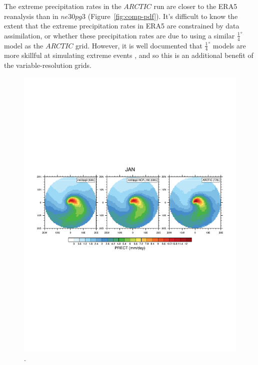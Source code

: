 \documentclass[draft]{agujournal2019}
\begin{document}
The extreme precipitation rates in the $ARCTIC$ run are closer to the ERA5 reanalysis than in $ne30pg3$ (Figure~\ref{fig:comp-pdf}). It's difficult to know the extent that the extreme precipitation rates in ERA5 are constrained by data assimilation, or whether these precipitation rates are due to using a similar $\frac{1}{4}^{\circ}$ model as the $ARCTIC$ grid. However, it is well documented that $\frac{1}{4}^{\circ}$ models are more skillful at simulating extreme events \cite{BetAl2013JC,OETAL2016JAMES}, and so this is an additional benefit of the variable-resolution grids.

\begin{figure}[t]
\begin{center}
         \includegraphics[width=130mm]{figs/temp_composite_ge45N_JAN-PRECT.pdf}
\end{center}
\caption{.}
\label{fig:comp-mean}
\end{figure}
\end{document}
